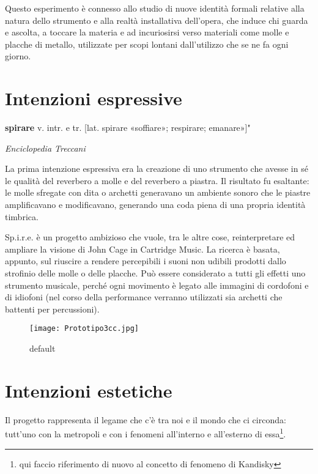 Questo esperimento è connesso allo studio di nuove identità formali relative alla natura dello strumento e alla realtà installativa dell'opera, che induce chi guarda e ascolta, a toccare la materia e ad incuriosirsi verso materiali come molle e placche di metallo, utilizzate per scopi lontani dall'utilizzo che se ne fa ogni giorno.


\section{Intenzioni espressive}

\epigraph{\textbf{spirare} v. intr. e tr. [lat. spirare «soffiare»; respirare; emanare»]"}
{\textit{Enciclopedia Treccani}}
La prima intenzione espressiva era la creazione di uno strumento che avesse in sé le qualità del reverbero a molle e del reverbero a piastra. Il risultato fu esaltante: le molle sfregate con dita o archetti generavano un ambiente sonoro che le piastre amplificavano e modificavano, generando una coda piena di una propria identità timbrica.

Sp.i.r.e. è un progetto ambizioso che vuole, tra le altre cose, reinterpretare ed ampliare la visione di John Cage in Cartridge Music. La ricerca è basata, appunto, sul riuscire a rendere percepibili i suoni non udibili prodotti dallo strofinio delle molle o delle placche. Può essere considerato a tutti gli effetti uno strumento musicale, perché ogni movimento è legato alle immagini di cordofoni e di idiofoni (nel corso della performance verranno utilizzati sia archetti che battenti per percussioni).

\begin{figure}[htbp]
\begin{center}
\texttt{[image: Prototipo3cc.jpg]}
\caption{default}
\label{default}
\end{center}
\end{figure}


\section{Intenzioni estetiche}
Il progetto rappresenta il legame che c'è tra noi e il mondo che ci circonda: tutt'uno con la metropoli e con i fenomeni all'interno e all'esterno di essa\footnote{qui faccio riferimento di nuovo al concetto di fenomeno di Kandisky}.

